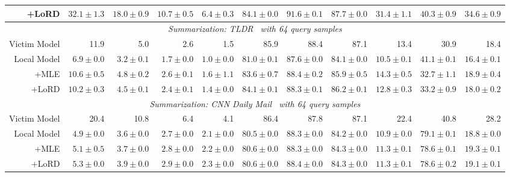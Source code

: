 \documentclass[letterpaper]{article} %
\newcommand{\red}{\cellcolor{lzred!68} } %
\newcommand{\gret}{\cellcolor{lzred!48} } %
\newcommand{\gres}{\cellcolor{lzred!28} } %
\newcommand{\grem}{\cellcolor{lzgreen!18} } %
\newcommand{\grel}{\cellcolor{lzgreen!38} } %
\newcommand{\grexl}{\cellcolor{lzgreen!68} } %
\newcommand{\greyc}{\cellcolor{lzgrey!28} }
\begin{document}
\begin{table*}[t]
{\begin{tabular}{r|rrrrrrrrrr}
+LoRD         & \grem $32.1\pm 1.3$ & \grel $18.0\pm 0.9$ & \grel $10.7\pm 0.5$ & \grel $6.4\pm 0.3$ & \gret $84.1\pm 0.0$ & \grel $91.6\pm 0.1$ & \gres $87.7\pm 0.0$ & \grem $31.4\pm 1.1$ & \grel $40.3\pm 0.9$ & \grem $34.6\pm 0.9$ \\\hline
\multicolumn{11}{c}{\emph{Summarization: TLDR~\citep{tldr} with 64 query samples}}                                                                             \\\hline
Victim Model & \greyc 11.9& \greyc 5.0 & \greyc 2.6 & \greyc 1.5& \greyc 85.9& \greyc 88.4& \greyc 87.1& \greyc 13.4&\greyc 30.9& \greyc 18.4\\
Local Model  & \red  $6.9\pm 0.0$& \grem  $3.2\pm 0.1$& \grel  $1.7\pm 0.0$& \grel  $1.0\pm 0.0$& \gres  $81.0\pm 0.1$& \grem  $87.6\pm 0.0$& \gres  $84.1\pm 0.0$& \gres  $10.5\pm 0.1$& \grel  $41.1\pm 0.1$& \red  $16.4\pm 0.1$\\
+MLE         & \grel  $10.6\pm 0.5$& \grel $4.8\pm 0.2$ & \grel $2.6\pm 0.1$ & \grel $1.6\pm 1.1$ & \grem $83.6\pm 0.7$ & \grel $88.4\pm 0.2$ & \grem $85.9\pm 0.5$ & \grel $14.3\pm 0.5$ & \grexl $32.7\pm 1.1$& \grel  $18.9\pm 0.4$\\
+LoRD         & \grem  $10.2\pm 0.3$& \grel $4.5\pm 0.1$ & \grel $2.4\pm 0.1$ & \grel $1.4\pm 0.0$ & \grem $84.1\pm 0.1$ & \grel $88.3\pm 0.1$ & \grel $86.2\pm 0.1$ & \grel $12.8\pm 0.3$ & \grexl $33.2\pm 0.9$& \grel  $18.0\pm 0.2$\\\hline
\multicolumn{11}{c}{\emph{Summarization: CNN Daily Mail~\citep{cnn} with 64 query samples}}                                                                             \\\hline
Victim Model & \greyc 20.4 & \greyc 10.8& \greyc 6.4& \greyc 4.1&\greyc 86.4 & \greyc 87.8& \greyc 87.1& \greyc 22.4& \greyc 40.8& \greyc 28.2\\
Local Model  & \red  $4.9\pm 0.0$& \gret  $3.6\pm 0.0$& \gres  $2.7\pm 0.0$& \grem  $2.1\pm 0.0$& \gret $80.5\pm 0.0$& \grel  $88.3\pm 0.0$& \gres   $84.2\pm 0.0$& \red  $10.9\pm 0.0$& \grexl  $79.1\pm 0.1$& \gret  $18.8\pm 0.0$\\
+MLE         & \red  $5.1\pm 0.5$& \gret  $3.7\pm 0.0$& \gres  $2.8\pm 0.0$& \grem  $2.2\pm 0.0$& \gret  $80.6\pm 0.0$& \grexl  $88.3\pm 0.0$& \gres  $84.3\pm 0.0$& \red  $11.3\pm 0.1$& \grexl  $78.6\pm 0.1$  & \red  $19.3\pm 0.1$\\
+LoRD         & \red  $5.3\pm 0.0$& \gret  $3.9\pm 0.0$& \gres  $2.9\pm 0.0$& \grem  $2.3\pm 0.0$& \gret  $80.6\pm 0.0$& \grexl  $88.4\pm 0.0$& \gres  $84.3\pm 0.0$& \red  $11.3\pm 0.1$& \grexl  $78.6\pm 0.2$  & \red   $19.1\pm 0.1$\\\hline

\end{tabular}}
\end{table*}
\end{document}
